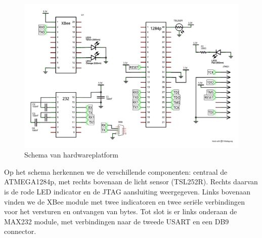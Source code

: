 \begin{figure}[ht]
  \centering
  \includegraphics[width=\linewidth]{resources/hardware-platform-schematic.pdf}
  \caption{Schema van hardwareplatform}
  \label{fig:hardware-platform-schematic}
\end{figure}

Op het schema herkennen we de verschillende componenten: centraal de
ATMEGA1284p, met rechts bovenaan de licht sensor (TSL252R). Rechts daarvan is
de rode LED indicator en de JTAG aansluiting weergegeven. Links bovenaan vinden
we de XBee module met twee indicatoren en twee seri\"ele verbindingen voor het
versturen en ontvangen van bytes. Tot slot is er links onderaan de MAX232
module, met verbindingen naar de tweede USART en een DB9 connector.

